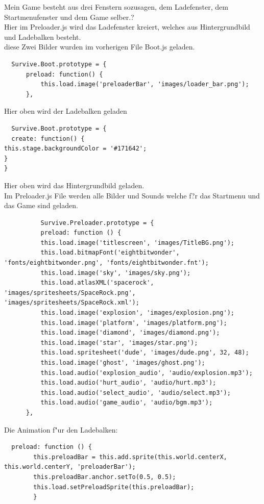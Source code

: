 \documentclass{article}
\begin{document}
Mein Game besteht aus drei Fenstern sozusagen, dem Ladefenster, dem Startmenufenster und dem Game selber.?\\
Hier im Preloader.js wird das Ladefenster kreiert, welches aus Hintergrundbild und Ladebalken besteht.\\
diese Zwei Bilder wurden im vorherigen File Boot.js geladen.\\

\begin{lstlisting}
  Survive.Boot.prototype = {
      preload: function() {
          this.load.image('preloaderBar', 'images/loader_bar.png');
      },
\end{lstlisting}

Hier oben wird der Ladebalken geladen

\begin{lstlisting}
  Survive.Boot.prototype = {
  create: function() {
this.stage.backgroundColor = '#171642';
}
}
\end{lstlisting}
Hier oben wird das Hintergrundbild geladen.\\
Im Preloader.js File werden alle Bilder und Sounds welche f?r das Startmenu und das Game sind geladen.


\begin{lstlisting}
          Survive.Preloader.prototype = {
          preload: function () {
          this.load.image('titlescreen', 'images/TitleBG.png');
          this.load.bitmapFont('eightbitwonder', 'fonts/eightbitwonder.png', 'fonts/eightbitwonder.fnt');
          this.load.image('sky', 'images/sky.png');
          this.load.atlasXML('spacerock', 'images/spritesheets/SpaceRock.png', 'images/spritesheets/SpaceRock.xml');
          this.load.image('explosion', 'images/explosion.png');
          this.load.image('platform', 'images/platform.png');
          this.load.image('diamond', 'images/diamond.png');
          this.load.image('star', 'images/star.png');
          this.load.spritesheet('dude', 'images/dude.png', 32, 48);
          this.load.image('ghost', 'images/ghost.png');
          this.load.audio('explosion_audio', 'audio/explosion.mp3');
          this.load.audio('hurt_audio', 'audio/hurt.mp3');
          this.load.audio('select_audio', 'audio/select.mp3');
          this.load.audio('game_audio', 'audio/bgm.mp3');
      },
\end{lstlisting}


Die Animation f"ur den Ladebalken:
\begin{lstlisting}
  preload: function () {
        this.preloadBar = this.add.sprite(this.world.centerX, this.world.centerY, 'preloaderBar');
        this.preloadBar.anchor.setTo(0.5, 0.5);
        this.load.setPreloadSprite(this.preloadBar);
        }
\end{lstlisting}
\end{document}
